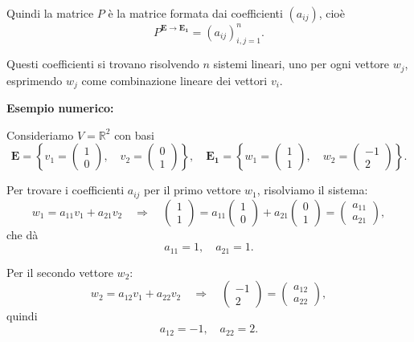 \documentclass[12pt,a4paper]{article}
\begin{document}
Quindi la matrice \( P \) è la matrice formata dai coefficienti \( (a_{ij}) \), cioè
\[
P^{\bm{E} \to \bm{E_1}} = (a_{ij})_{i,j=1}^n.
\]

Questi coefficienti si trovano risolvendo \( n \) sistemi lineari, uno per ogni vettore \( w_j \), esprimendo \( w_j \) come combinazione lineare dei vettori \( v_i \).

\vspace{0.3cm}
\textbf{Esempio numerico:}

Consideriamo \( V = \mathbb{R}^2 \) con basi  
\[
\bm{E} = \left\{ v_1 = \begin{pmatrix} 1 \\ 0 \end{pmatrix}, \quad v_2 = \begin{pmatrix} 0 \\ 1 \end{pmatrix} \right\}
,\quad\bm{E_1} = \left\{ w_1 = \begin{pmatrix} 1 \\ 1 \end{pmatrix}, \quad w_2 = \begin{pmatrix} -1 \\ 2 \end{pmatrix} \right\}.
\]

Per trovare i coefficienti \( a_{ij} \) per il primo vettore \( w_1 \), risolviamo il sistema:
\[
w_1 = a_{11} v_1 + a_{21} v_2 \quad \Longrightarrow \quad
\begin{pmatrix} 1 \\ 1 \end{pmatrix} = a_{11} \begin{pmatrix} 1 \\ 0 \end{pmatrix} + a_{21} \begin{pmatrix} 0 \\ 1 \end{pmatrix} = \begin{pmatrix} a_{11} \\ a_{21} \end{pmatrix},
\]
che dà  
\[
a_{11} = 1, \quad a_{21} = 1.
\]

Per il secondo vettore \( w_2 \):
\[
w_2 = a_{12} v_1 + a_{22} v_2 \quad \Longrightarrow \quad
\begin{pmatrix} -1 \\ 2 \end{pmatrix} = \begin{pmatrix} a_{12} \\ a_{22} \end{pmatrix},
\]
quindi
\[
a_{12} = -1, \quad a_{22} = 2.
\]
\end{document}

